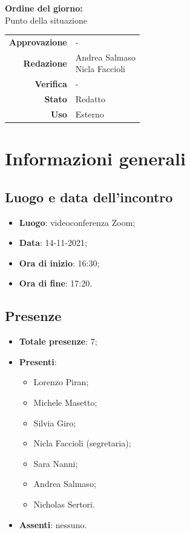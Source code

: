 \documentclass[11pt]{article}
\begin{document}
\begin{titlepage}
\begin{center}
			\large
			
			\vfill
			\textbf{Ordine del giorno:} \\
			Punto della situazione
			\vfill
			
			\begin{tabular}{r|l}
				\textbf{Approvazione} &  -\\
				\textbf{Redazione} &  \parbox[t]{3.5cm}{Andrea Salmaso \\Nicla Faccioli}\\
				\textbf{Verifica} &  -\\
				\textbf{Stato} & Redatto \\
				\textbf{Uso} & Esterno
			\end{tabular}
			\vfill
			
		\end{center}
	\end{titlepage}

	\newpage

	\section{Informazioni generali}
	\subsection{Luogo e data dell'incontro}
	\begin{itemize}
		\item \textbf{Luogo}: videoconferenza Zoom;
		\item \textbf{Data}: 14-11-2021;
		\item \textbf{Ora di inizio}: 16:30;
		\item \textbf{Ora di fine}: 17:20.
	\end{itemize}
	
	\subsection{Presenze}
	\begin{itemize}
		\item \textbf{Totale presenze}: 7;
		\item \textbf{Presenti}:
		\begin{itemize}
			\item Lorenzo Piran;
			\item Michele Masetto;
			\item Silvia Giro;
			\item Nicla Faccioli (segretaria);
			\item Sara Nanni;
			\item Andrea Salmaso;
			\item Nicholas Sertori.		
		\end{itemize}
		\item \textbf{Assenti}: nessuno.
	\end{itemize}
\end{document}
